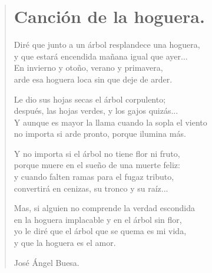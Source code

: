 \documentclass[11pt, portrait, twoside, notitlepage, openright]{book}
\begin{document}
\newpage
\begin{verse}
\begin{center}
\section{Canción de la hoguera.}
\end{center}
Diré que junto a un árbol resplandece una hoguera,\\
y que estará encendida mañana igual que ayer...\\
En invierno y otoño, verano y primavera,\\
arde esa hoguera loca sin que deje de arder.
\newline

Le dio sus hojas secas el árbol corpulento;\\
después, las hojas verdes, y los gajos quizás...\\
Y aunque es mayor la llama cuando la sopla el viento\\
no importa si arde pronto, porque ilumina más.
\newline

Y no importa si el árbol no tiene flor ni fruto,\\
porque muere en el sueño de una muerte feliz:\\
y cuando falten ramas para el fugaz tributo,\\
convertirá en cenizas, su tronco y su raíz...
\newline

Mas, si alguien no comprende la verdad escondida\\
en la hoguera implacable y en el árbol sin flor,\\
yo le diré que el árbol que se quema es mi vida,\\
y que la hoguera es el amor.
\newline

José Ángel Buesa.
\end{verse}
\end{document}
